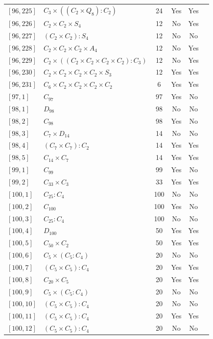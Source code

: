 \documentclass[12pt, a4paper]{article}
\theoremstyle{plain}
\theoremstyle{definition}
\begin{document}
\begin{longtable}{llcccl}
  $[96,225]$ & $C_3 \times ((C_2 \times Q_8) : C_2)$ & 24 & Yes & Yes \\
  $[96,226]$ & $C_2 \times C_2 \times S_4$ & 12 & No & Yes \\
  $[96,227]$ & $(C_2 \times C_2) : S_4$ & 12 & No & No \\
  $[96,228]$ & $C_2 \times C_2 \times C_2 \times A_4$ & 12 & No & Yes \\
  $[96,229]$ & $C_2 \times ((C_2 \times C_2 \times C_2 \times C_2) : C_3)$ & 12 & No & Yes \\
  $[96,230]$ & $C_2 \times C_2 \times C_2 \times C_2 \times S_3$ & 12 & Yes & Yes \\
  $[96,231]$ & $C_6 \times C_2 \times C_2 \times C_2 \times C_2$ & 6 & Yes & Yes \\
  $[97,1]$ & $C_{97}$ & 97 & Yes & No \\
  $[98,1]$ & $D_{98}$ & 98 & No & No \\
  $[98,2]$ & $C_{98}$ & 98 & Yes & No \\
  $[98,3]$ & $C_7 \times D_{14}$ & 14 & No & No \\
  $[98,4]$ & $(C_7 \times C_7) : C_2$ & 14 & Yes & Yes \\
  $[98,5]$ & $C_{14} \times C_7$ & 14 & Yes & Yes \\
  $[99,1]$ & $C_{99}$ & 99 & Yes & No \\
  $[99,2]$ & $C_{33} \times C_3$ & 33 & Yes & Yes \\
  $[100,1]$ & $C_{25} : C_4$ & 100 & No & No \\
  $[100,2]$ & $C_{100}$ & 100 & Yes & No \\
  $[100,3]$ & $C_{25} : C_4$ & 100 & No & No \\
  $[100,4]$ & $D_{100}$ & 50 & Yes & Yes \\
  $[100,5]$ & $C_{50} \times C_2$ & 50 & Yes & Yes \\
  $[100,6]$ & $C_5 \times (C_5 : C_4)$ & 20 & No & No \\
  $[100,7]$ & $(C_5 \times C_5) : C_4$ & 20 & Yes & Yes \\
  $[100,8]$ & $C_{20} \times C_5$ & 20 & Yes & Yes \\
  $[100,9]$ & $C_5 \times (C_5 : C_4)$ & 20 & No & No \\
  $[100,10]$ & $(C_5 \times C_5) : C_4$ & 20 & No & No \\
  $[100,11]$ & $(C_5 \times C_5) : C_4$ & 20 & Yes & Yes \\
  $[100,12]$ & $(C_5 \times C_5) : C_4$ & 20 & No & No \\

\end{longtable}
\end{document}
